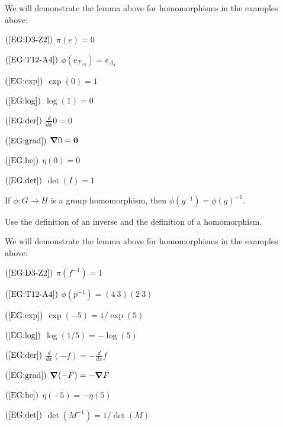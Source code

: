 \documentclass{ximera}
\begin{document}
\begin{example}
  We will demonstrate the lemma above for homomorphisms in the
  examples above:
  \begin{description}
    \begin{multicols}{2}
    \item[$(\ref{EG:D3-Z2})$] $\pi(e) = 0$
    \item[$(\ref{EG:T12-A4})$] $\phi(e_{\mathcal{T}_{12}}) = e_{A_4}$
    \item[$(\ref{EG:exp})$] $\exp(0) = 1$
    \item[$(\ref{EG:log})$] $\log(1) = 0$
    \item[$(\ref{EG:der})$] $\frac{d}{dx}0 = 0$
    \item[$(\ref{EG:grad})$] $\boldsymbol\nabla 0 = \mathbf{0}$
    \item[$(\ref{EG:he})$] $\eta(0) = 0$
    \item[$(\ref{EG:det})$] $\det(I) = 1$
    \end{multicols}
  \end{description}
\end{example}




\begin{lemma}\label{L:HPI}
  If $\phi:G\to H$ is a group homomorphism, then $\phi(g^{-1}) =
  \phi(g)^{-1}$.
  \begin{sketch}
    Use the definition of an inverse and the definition of a
    homomorphism.
  \end{sketch}
\end{lemma}

\begin{example}
  We will demonstrate the lemma above for homomorphisms in the
  examples above:
  \begin{description}
    \begin{multicols}{2}
    \item[$(\ref{EG:D3-Z2})$] $\pi(f^{-1}) = 1$
    \item[$(\ref{EG:T12-A4})$] $\phi(p^{-1}) = (4\ 3)(2 \ 3)$
    \item[$(\ref{EG:exp})$] $\exp(-5) = 1/\exp(5)$
    \item[$(\ref{EG:log})$] $\log(1/5) = -\log(5)$
    \item[$(\ref{EG:der})$] $\frac{d}{dx}(-f) = -\frac{d}{dx}f$
    \item[$(\ref{EG:grad})$] $\boldsymbol\nabla( -F) = -\boldsymbol\nabla F$
    \item[$(\ref{EG:he})$] $\eta(-5) = -\eta( 5)$
    \item[$(\ref{EG:det})$] $\det(M^{-1}) = 1/\det(M)$
    \end{multicols}
  \end{description}
\end{example}
\end{document}
